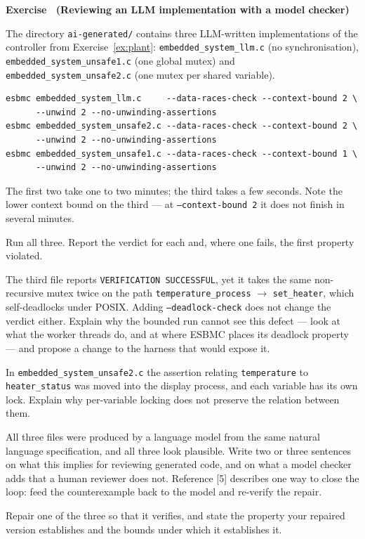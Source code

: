 \documentclass[11pt,a4paper]{article}
\newcommand{\esbmc}{ESBMC}
\newcommand{\flag}[1]{\texttt{\small #1}}
\newcommand{\file}[1]{\texttt{\small #1}}
\newcounter{exc}
\renewcommand{\theexc}{\arabic{exc}}
\newenvironment{exercise}[2][]
  {\stepcounter{exc}\ifx\relax#1\relax\else\excref{#1}\fi%
   \medskip\noindent\textbf{Exercise \theexc\ (#2)}\par\nopagebreak\smallskip}
  {\par\medskip}
\begin{document}
\begin{exercise}{Reviewing an LLM implementation with a model checker}
The directory \file{ai-generated/} contains three LLM-written implementations of
the controller from Exercise~\ref{ex:plant}: \file{embedded\_system\_llm.c} (no
synchronisation), \file{embedded\_system\_unsafe1.c} (one global mutex) and
\file{embedded\_system\_unsafe2.c} (one mutex per shared variable).

\begin{lstlisting}[style=sh]
esbmc embedded_system_llm.c     --data-races-check --context-bound 2 \
      --unwind 2 --no-unwinding-assertions
esbmc embedded_system_unsafe2.c --data-races-check --context-bound 2 \
      --unwind 2 --no-unwinding-assertions
esbmc embedded_system_unsafe1.c --data-races-check --context-bound 1 \
      --unwind 2 --no-unwinding-assertions
\end{lstlisting}

The first two take one to two minutes; the third takes a few seconds. Note the
lower context bound on the third --- at \flag{--context-bound 2} it does not
finish in several minutes.

\begin{parts}
  \item Run all three. Report the verdict for each and, where one fails, the
        first property violated.
  \item The third file reports \texttt{VERIFICATION SUCCESSFUL}, yet it takes
        the same non-recursive mutex twice on the path
        \texttt{temperature\_process} $\rightarrow$ \texttt{set\_heater}, which
        self-deadlocks under POSIX. Adding \flag{--deadlock-check} does not
        change the verdict either. Explain why the bounded run cannot see this
        defect --- look at what the worker threads do, and at where \esbmc{}
        places its deadlock property --- and propose a change to the harness
        that would expose it.
  \item In \file{embedded\_system\_unsafe2.c} the assertion relating
        \texttt{temperature} to \texttt{heater\_status} was moved into the
        display process, and each variable has its own lock. Explain why
        per-variable locking does not preserve the relation between them.
  \item All three files were produced by a language model from the same natural
        language specification, and all three look plausible. Write two or three
        sentences on what this implies for reviewing generated code, and on what
        a model checker adds that a human reviewer does not. Reference [5]
        describes one way to close the loop: feed the counterexample back to the
        model and re-verify the repair.
  \item Repair one of the three so that it verifies, and state the property your
        repaired version establishes and the bounds under which it establishes
        it.
\end{parts}
\end{exercise}
\end{document}
